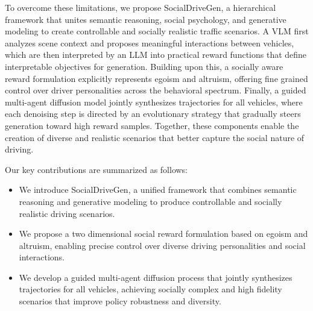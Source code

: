 To overcome these limitations, we propose SocialDriveGen, a hierarchical framework that unites semantic reasoning, social psychology, and generative modeling to create controllable and socially realistic traffic scenarios. A VLM first analyzes scene context and proposes meaningful interactions between vehicles, which are then interpreted by an LLM into practical reward functions that define interpretable objectives for generation. Building upon this, a socially aware reward formulation explicitly represents egoism and altruism, offering fine grained control over driver personalities across the behavioral spectrum. Finally, a guided multi-agent diffusion model jointly synthesizes trajectories for all vehicles, where each denoising step is directed by an evolutionary strategy that gradually steers generation toward high reward samples. Together, these components enable the creation of diverse and realistic scenarios that better capture the social nature of driving.

Our key contributions are summarized as follows:
\begin{itemize}
    \item We introduce SocialDriveGen, a unified framework that combines semantic reasoning and generative modeling to produce controllable and socially realistic driving scenarios.
    \item We propose a two dimensional social reward formulation based on egoism and altruism, enabling precise control over diverse driving personalities and social interactions.
    \item We develop a guided multi-agent diffusion process that jointly synthesizes trajectories for all vehicles, achieving socially complex and high fidelity scenarios that improve policy robustness and diversity.
\end{itemize}
